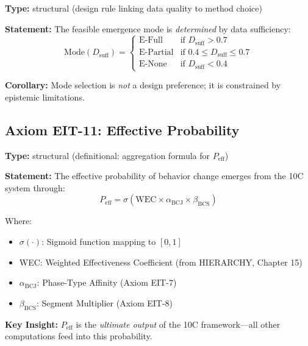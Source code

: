 \begin{tcolorbox}[colback=blue!5!white, colframe=blue!75!black,
    title=\textbf{Axiom EIT-10: Data-Mode Correspondence}]

\textbf{Type:} structural (design rule linking data quality to method choice)

\textbf{Statement:} The feasible emergence mode is \textit{determined} by data sufficiency:
\begin{equation}
\boxed{
\text{Mode}(D_{\text{suff}}) = \begin{cases}
\text{E-Full} & \text{if } D_{\text{suff}} > 0.7 \\
\text{E-Partial} & \text{if } 0.4 \leq D_{\text{suff}} \leq 0.7 \\
\text{E-None} & \text{if } D_{\text{suff}} < 0.4
\end{cases}
}
\label{eq:ie-data-mode}
\end{equation}

\textbf{Corollary:} Mode selection is \textit{not} a design preference; it is constrained by epistemic limitations.

\end{tcolorbox}

\subsection{Axiom EIT-11: Effective Probability}

\begin{tcolorbox}[colback=blue!5!white, colframe=blue!75!black,
    title=\textbf{Axiom EIT-11: Effective Probability of Behavior Change}]

\textbf{Type:} structural (definitional: aggregation formula for $P_{\text{eff}}$)

\textbf{Statement:} The effective probability of behavior change emerges from the 10C system through:
\begin{equation}
\boxed{P_{\text{eff}} = \sigma(\text{WEC} \times \alpha_{\text{BCJ}} \times \beta_{\text{BCS}})}
\label{eq:ie-peff}
\end{equation}

Where:
\begin{itemize}[nosep]
    \item $\sigma(\cdot)$: Sigmoid function mapping to $[0,1]$
    \item WEC: Weighted Effectiveness Coefficient (from HIERARCHY, Chapter 15)
    \item $\alpha_{\text{BCJ}}$: Phase-Type Affinity (Axiom EIT-7)
    \item $\beta_{\text{BCS}}$: Segment Multiplier (Axiom EIT-8)
\end{itemize}

\textbf{Key Insight:} $P_{\text{eff}}$ is the \textit{ultimate output} of the 10C framework---all other computations feed into this probability.

\end{tcolorbox}

